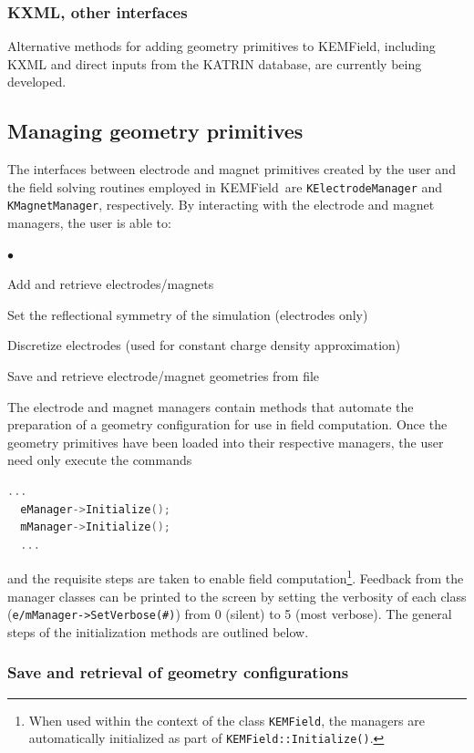 \documentclass[11pt,a4paper,oneside]{article}
\newcommand{\katrin}     {{\sc KATRIN }}
\newcommand{\kemfield}    {{\sc KEMField}}
\newcommand{\squishlist}{
   \begin{list}{$\bullet$}
    { \setlength{\itemsep}{0pt}      \setlength{\parsep}{3pt}
      \setlength{\topsep}{3pt}       \setlength{\partopsep}{0pt}
      \setlength{\leftmargin}{1.5em} \setlength{\labelwidth}{1em}
      \setlength{\labelsep}{0.5em} } }
\newcommand{\squishend}{
    \end{list}  }
\begin{document}
\subsubsection{KXML, other interfaces}
\label{subsubsec:otherInterfaces}

Alternative methods for adding geometry primitives to \kemfield, including {\sc KXML}\cite{Furse} and direct inputs from the \katrin database, are currently being developed.  

\subsection{Managing geometry primitives}
\label{subsec:managingPrimitives}

The interfaces between electrode and magnet primitives created by the user and the field solving routines employed in \kemfield\ are \texttt{KElectrodeManager} and \texttt{KMagnetManager}, respectively.  By interacting with the electrode and magnet managers, the user is able to:
%
\squishlist
\item Add and retrieve electrodes/magnets
\item Set the reflectional symmetry of the simulation (electrodes only)
\item Discretize electrodes (used for constant charge density approximation)
\item Save and retrieve electrode/magnet geometries from file
\squishend
%
The electrode and magnet managers contain methods that automate the preparation of a geometry configuration for use in field computation.  Once the geometry primitives have been loaded into their respective managers, the user need only execute the commands 
%
\begin{lstlisting}[language=C++]
  ...
  eManager->Initialize();
  mManager->Initialize();
  ...
\end{lstlisting}
%
and the requisite steps are taken to enable field computation\footnote{When used within the context of the class \texttt{KEMField}, the managers are automatically initialized as part of \texttt{KEMField::Initialize()}.}.  Feedback from the manager classes can be printed to the screen by setting the verbosity of each class (\texttt{e/mManager->SetVerbose(\#)}) from 0 (silent) to 5 (most verbose).  The general steps of the initialization methods are outlined below.  

\subsubsection{Save and retrieval of geometry configurations}
\label{subsubsec:saveRetrieve}
\end{document}
